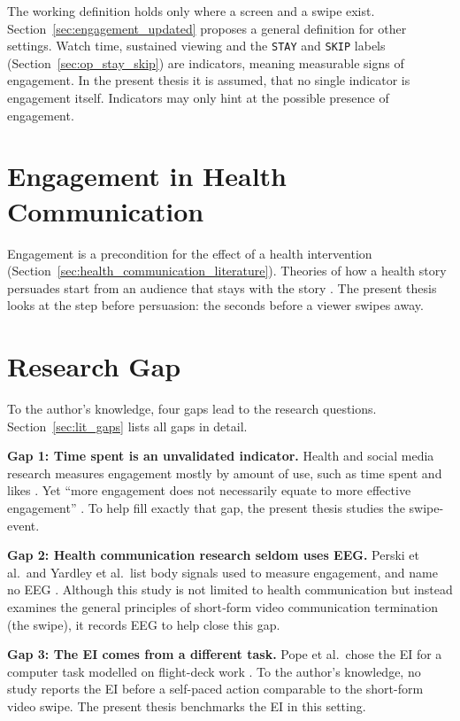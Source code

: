 \documentclass[12pt,a4paper]{report}
\begin{document}
The working definition holds only where a screen and a swipe exist. Section~\ref{sec:engagement_updated} proposes a general definition for other settings. Watch time, sustained viewing and the \texttt{STAY} and \texttt{SKIP} labels (Section~\ref{sec:op_stay_skip}) are indicators, meaning measurable signs of engagement. In the present thesis it is assumed, that no single indicator is engagement itself. Indicators may only hint at the possible presence of engagement.

\section{Engagement in Health Communication}
\label{sec:intro_health_communication}

Engagement is a precondition for the effect of a health intervention \cite{yardley_understanding_2016} (Section~\ref{sec:health_communication_literature}). Theories of how a health story persuades start from an audience that stays with the story \cite{green_role_2000, moyer-guse_toward_2008}. The present thesis looks at the step before persuasion: the seconds before a viewer swipes away.

\section{Research Gap}
\label{sec:intro_research_gap}

To the author's knowledge, four gaps lead to the research questions. Section~\ref{sec:lit_gaps} lists all gaps in detail.

\textbf{Gap 1: Time spent is an unvalidated indicator.} Health and social media research measures engagement mostly by amount of use, such as time spent and likes \cite{perski_conceptualising_2017, trunfio_conceptualising_2021}. Yet ``more engagement does not necessarily equate to more effective engagement'' \cite{yardley_understanding_2016}. To help fill exactly that gap, the present thesis studies the swipe-event.

\textbf{Gap 2: Health communication research seldom uses EEG.} Perski et al.\ and Yardley et al.\ list body signals used to measure engagement, and name no EEG \cite{perski_conceptualising_2017, yardley_understanding_2016}. Although this study is not limited to health communication but instead examines the general principles of short‑form video communication termination (the swipe), it records EEG to help close this gap.

\textbf{Gap 3: The EI comes from a different task.} Pope et al.\ chose the EI for a computer task modelled on flight-deck work \cite{pope_biocybernetic_1995-3}. To the author's knowledge, no study reports the EI before a self-paced action comparable to the short-form video swipe. The present thesis benchmarks the EI in this setting.
\end{document}
